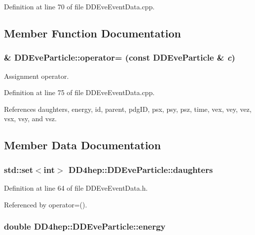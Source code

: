 Definition at line 70 of file DDEveEventData.cpp.

\subsection{Member Function Documentation}
\hypertarget{class_d_d4hep_1_1_d_d_eve_particle_aa435c5ef002b03be3f38e5fd5c313b62}{
\subsubsection[{operator=}]{ \& DDEveParticle::operator= (const {\bf DDEveParticle} \& {\em c})}}
\label{class_d_d4hep_1_1_d_d_eve_particle_aa435c5ef002b03be3f38e5fd5c313b62}


Assignment operator. 

Definition at line 75 of file DDEveEventData.cpp.

References daughters, energy, id, parent, pdgID, psx, psy, psz, time, vex, vey, vez, vsx, vsy, and vsz.

\subsection{Member Data Documentation}
\hypertarget{class_d_d4hep_1_1_d_d_eve_particle_a6cd73e254f4338306c06c54e1a9f2843}{
\subsubsection[{daughters}]{\setlength{\rightskip}{0pt plus 5cm}std::set$<$int$>$ {\bf DD4hep::DDEveParticle::daughters}}}
\label{class_d_d4hep_1_1_d_d_eve_particle_a6cd73e254f4338306c06c54e1a9f2843}


Definition at line 64 of file DDEveEventData.h.

Referenced by operator=().\hypertarget{class_d_d4hep_1_1_d_d_eve_particle_ac874addd7f825b87415e65722860743d}{
\subsubsection[{energy}]{\setlength{\rightskip}{0pt plus 5cm}double {\bf DD4hep::DDEveParticle::energy}}}
\label{class_d_d4hep_1_1_d_d_eve_particle_ac874addd7f825b87415e65722860743d}


